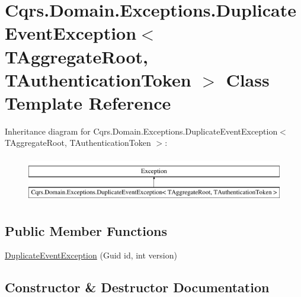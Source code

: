 \hypertarget{classCqrs_1_1Domain_1_1Exceptions_1_1DuplicateEventException}{}\section{Cqrs.\+Domain.\+Exceptions.\+Duplicate\+Event\+Exception$<$ T\+Aggregate\+Root, T\+Authentication\+Token $>$ Class Template Reference}
\label{classCqrs_1_1Domain_1_1Exceptions_1_1DuplicateEventException}
Inheritance diagram for Cqrs.\+Domain.\+Exceptions.\+Duplicate\+Event\+Exception$<$ T\+Aggregate\+Root, T\+Authentication\+Token $>$\+:\begin{figure}[H]
\begin{center}
\leavevmode
\includegraphics[height=2.000000cm]{classCqrs_1_1Domain_1_1Exceptions_1_1DuplicateEventException}
\end{center}
\end{figure}
\subsection*{Public Member Functions}
\begin{DoxyCompactItemize}
\item 
\hyperlink{classCqrs_1_1Domain_1_1Exceptions_1_1DuplicateEventException_a33eb0ada16fe2395ea921f571e45c415_a33eb0ada16fe2395ea921f571e45c415}{Duplicate\+Event\+Exception} (Guid id, int version)
\end{DoxyCompactItemize}


\subsection{Constructor \& Destructor Documentation}
\mbox{\label{classCqrs_1_1Domain_1_1Exceptions_1_1DuplicateEventException_a33eb0ada16fe2395ea921f571e45c415_a33eb0ada16fe2395ea921f571e45c415}} 
